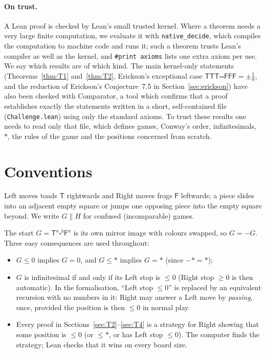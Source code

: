 \documentclass[11pt,a4paper]{article}
\newcommand{\Tt}{\mathsf{T}}
\newcommand{\Ff}{\mathsf{F}}
\newcommand{\E}{\square}
\newcommand{\lean}[1]{\texttt{#1}}
\newcommand{\fuzzy}{\mathrel{\|}}
\theoremstyle{plain}
\theoremstyle{remark}
\begin{document}
\paragraph{On trust.}
A Lean proof is checked by Lean's small trusted kernel. Where a theorem needs a very large finite
computation, we evaluate it with \lean{native\_decide}, which compiles the computation to machine
code and runs it; such a theorem trusts Lean's compiler as well as the kernel, and \lean{\#print
axioms} lists one extra axiom per use. We say which results are of which kind. The main
kernel-only statements (Theorems~\ref{thm:T1} and~\ref{thm:T2}, Erickson's exceptional case
$\Tt\Tt\Tt\E\E\Ff\Ff\Ff=\pm\frac18$, and the reduction of Erickson's Conjecture~7.5 in
Section~\ref{sec:erickson}) have also been checked with Comparator, a tool which confirms that a
proof establishes exactly the statements written in a short, self-contained file
(\texttt{Challenge.lean}) using only the standard axioms. To trust these results one needs to read
only that file, which defines games, Conway's order, infinitesimals, $\ast$, the rules of the game
and the positions concerned from scratch.

\section{Conventions}

Left moves toads $\Tt$ rightwards and Right moves frogs $\Ff$ leftwards; a piece slides into an
adjacent empty square or jumps one opposing piece into the empty square beyond. We write
$G\fuzzy H$ for confused (incomparable) games.

The start $G=\Tt^a\E^b\Ff^a$ is its own mirror image with colours swapped, so $G=-G$. Three easy
consequences are used throughout:
\begin{itemize}
\item $G\le 0$ implies $G=0$, and $G\le\ast$ implies $G=\ast$ (since $-\ast=\ast$);
\item $G$ is infinitesimal if and only if its Left stop is $\le 0$ (Right stop $\ge 0$ is then
  automatic). In the formalisation, ``Left stop $\le 0$'' is replaced by an equivalent recursion
  with no numbers in it: Right may answer a Left move by \emph{passing}, once, provided the
  position is then $\le 0$ in normal play.
\item Every proof in Sections~\ref{sec:T2}--\ref{sec:T4} is a strategy for Right showing that some position is $\le 0$ (or
  $\le\ast$, or has Left stop $\le0$). The computer finds the strategy; Lean checks that it wins
  on every board size.
\end{itemize}
\end{document}
